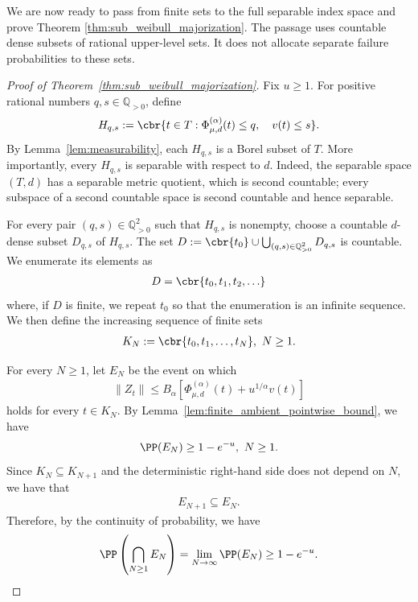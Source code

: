 \documentclass[11pt]{article}
\begin{document}
We are now ready to pass from finite sets to the full separable index
space and prove Theorem \ref{thm:sub_weibull_majorization}. The passage uses countable dense subsets of rational upper-level
sets. It does not allocate separate failure probabilities to these sets.

\begin{proof}[Proof of Theorem~\ref{thm:sub_weibull_majorization}]
Fix $u\ge1$. For positive rational numbers $q,s\in\mathbb Q_{>0}$,
define
\begin{align*}
H_{q,s}
:=
\cbr{
t\in T:
\Phi_{\mu,d}^{(\alpha)}(t)\le q,
\quad
v(t)\le s
}.
\end{align*}
By Lemma~\ref{lem:measurability}, each $H_{q,s}$ is a Borel subset of
$T$. More importantly, every $H_{q,s}$ is separable with respect to
$d$. Indeed, the separable space $(T,d)$ has a separable
metric quotient, which is second countable; every subspace of a second
countable space is second countable and hence separable.

For every pair $(q,s)\in\mathbb Q_{>0}^2$ such that $H_{q,s}$ is
nonempty, choose a countable $d$-dense subset $D_{q,s}$ of $H_{q,s}$.
The set $D
:=
\cbr{t_0}
\cup
\bigcup_{(q,s)\in\mathbb Q_{>0}^2}D_{q,s}$ is countable. We enumerate its elements as
\begin{align*}
D=\cbr{t_0,t_1,t_2,\ldots}
\end{align*}
where, if $D$ is finite, we repeat $t_0$ so that the enumeration is an
infinite sequence. We then define the increasing sequence of finite sets
\begin{align*}
K_N
:=
\cbr{t_0,t_1,\ldots,t_N},
\  N\ge1.
\end{align*}

For every $N\ge1$, let $E_N$ be the event on which
\begin{align*}
\|Z_t\|
\le
B_\alpha
\left[
\Phi_{\mu,d}^{(\alpha)}(t)
+u^{1/\alpha}v(t)
\right]
\end{align*}
holds for every $t\in K_N$. By
Lemma~\ref{lem:finite_ambient_pointwise_bound}, we have
\begin{align*}
\PP(E_N)\ge1-e^{-u},
\ N\ge1.
\end{align*}
Since
$K_N\subseteq K_{N+1}$ and the deterministic right-hand side does not
depend on $N$, we have that
\begin{align*}
E_{N+1}\subseteq E_N.
\end{align*}
Therefore, by the continuity of probability, we have
\begin{align*}
\PP\left(
\bigcap_{N\ge1}E_N
\right)
=
\lim_{N\to\infty}\PP(E_N)
\ge
1-e^{-u}.
\end{align*}


\end{proof}
\end{document}
